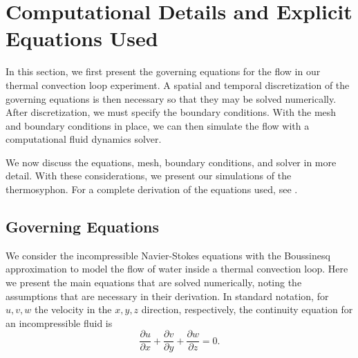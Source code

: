 \section{Computational Details and Explicit Equations Used}


In this section, we first present the governing equations for the flow in our thermal convection loop experiment.
A spatial and temporal discretization of the governing equations is then necessary so that they may be solved numerically.
After discretization, we must specify the boundary conditions.
With the mesh and boundary conditions in place, we can then simulate the flow with a computational fluid dynamics solver.

We now discuss the equations, mesh, boundary conditions, and solver in more detail.
With these considerations, we present our simulations of the thermosyphon.
For a complete derivation of the equations used, see \cite{reagan2013}.

\subsection{Governing Equations}
We consider the incompressible Navier-Stokes equations with the Boussinesq approximation to model the flow of water inside a thermal convection loop.
Here we present the main equations that are solved numerically, noting the assumptions that are necessary in their derivation.
In standard notation, for $u,v,w$ the velocity in the $x,y,z$ direction, respectively, the continuity equation for an incompressible fluid is
\begin{equation} \frac{\partial u}{\partial x} + \frac{\partial v}{\partial y} + \frac{\partial w}{\partial z} = 0. \label{eq:NScontIco} \end{equation}

